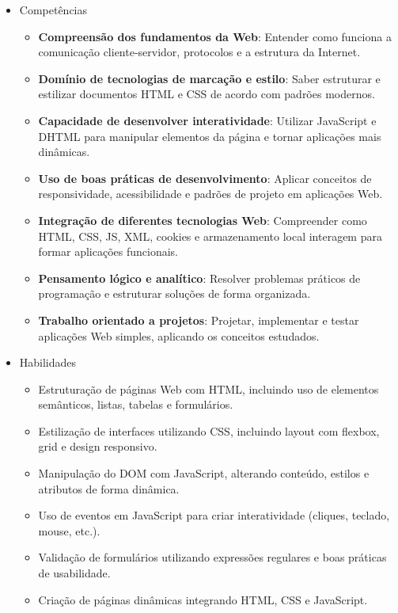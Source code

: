 \documentclass[a4paper, 12pt]{article}
\begin{document}
\begin{itemize}
    \item Competências
        \begin{itemize}
            \item \textbf{Compreensão dos fundamentos da Web}: Entender como funciona a comunicação cliente-servidor, protocolos e a estrutura da Internet.
            \item \textbf{Domínio de tecnologias de marcação e estilo}: Saber estruturar e estilizar documentos HTML e CSS de acordo com padrões modernos.
            \item \textbf{Capacidade de desenvolver interatividade}: Utilizar JavaScript e DHTML para manipular elementos da página e tornar aplicações mais dinâmicas.
            \item \textbf{Uso de boas práticas de desenvolvimento}: Aplicar conceitos de responsividade, acessibilidade e padrões de projeto em aplicações Web.
            \item \textbf{Integração de diferentes tecnologias Web}: Compreender como HTML, CSS, JS, XML, cookies e armazenamento local interagem para formar aplicações funcionais.
            \item \textbf{Pensamento lógico e analítico}: Resolver problemas práticos de programação e estruturar soluções de forma organizada.
            \item \textbf{Trabalho orientado a projetos}: Projetar, implementar e testar aplicações Web simples, aplicando os conceitos estudados.
        \end{itemize}
    \item Habilidades
        \begin{itemize}
            \item Estruturação de páginas Web com HTML, incluindo uso de elementos semânticos, listas, tabelas e formulários.
            \item Estilização de interfaces utilizando CSS, incluindo layout com flexbox, grid e design responsivo.
            \item Manipulação do DOM com JavaScript, alterando conteúdo, estilos e atributos de forma dinâmica.
            \item Uso de eventos em JavaScript para criar interatividade (cliques, teclado, mouse, etc.).
            \item Validação de formulários utilizando expressões regulares e boas práticas de usabilidade.
            \item Criação de páginas dinâmicas integrando HTML, CSS e JavaScript.

\end{itemize}
\end{itemize}
\end{document}
